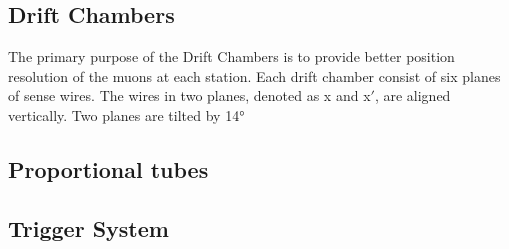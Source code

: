 \documentclass[../main.tex]{subfiles}
\begin{document}
\subsection{Drift Chambers}
The primary purpose of the Drift Chambers is to provide better position resolution of the muons
at each station. Each drift chamber consist of six planes of sense wires. The wires in two planes,
denoted as x and x$'$, are aligned vertically. Two planes are tilted by \ang[retain-explicit-plus]{+14}

\subsection{Proportional tubes}

\subsection{Trigger System}


\ifSubfilesClassLoaded{ \printbibliography[heading=bibintoc,title={References}]}{}
\end{document}
